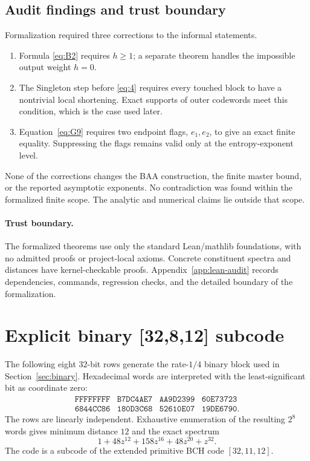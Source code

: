\documentclass[runningheads,envcountsame,envcountsect]{llncs}
\begin{document}
\subsection{Audit findings and trust boundary}

Formalization required three corrections to the informal statements.

\begin{enumerate}
    \item Formula \eqref{eq:B2} requires $h\ge1$; a separate theorem handles the
          impossible output weight $h=0$.
    \item The Singleton step before \eqref{eq:4} requires every touched block to have a
          nontrivial local shortening.  Exact supports of outer codewords meet
          this condition, which is the case used later.
    \item Equation~\eqref{eq:G9} requires two endpoint flags, $e_1,e_2$, to give an
      exact finite equality.  Suppressing the flags remains valid only at
          the entropy-exponent level.
\end{enumerate}

None of the corrections changes the BAA construction, the finite master bound,
or the reported asymptotic exponents.  No contradiction was found within the
formalized finite scope.  The analytic and numerical claims lie outside that
scope.

\paragraph{Trust boundary.}
The formalized theorems use only the standard Lean/mathlib foundations,
with no admitted proofs or project-local axioms.  Concrete constituent
spectra and distances have kernel-checkable proofs.
Appendix~\ref{app:lean-audit} records dependencies, commands, regression
checks, and the detailed boundary of the formalization.




\appendix
\renewcommand{\theHsection}{appendix.\Alph{section}}
\section{Explicit binary [32,8,12] subcode}
\label{app:binary-generator}

The following eight $32$-bit rows generate the rate-$1/4$ binary block used in
Section~\ref{sec:binary}.  Hexadecimal words are interpreted with the
least-significant bit as coordinate zero:
\[
\begin{array}{cccc}
\texttt{FFFFFFFF} & \texttt{B7DC4AE7} & \texttt{AA9D2399} & \texttt{60E73723}\\
\texttt{6844CC86} & \texttt{180D3C68} & \texttt{52610E07} & \texttt{19DE6790}.
\end{array}
\]
The rows are linearly independent.  Exhaustive enumeration of the resulting
$2^8$ words gives minimum distance $12$ and the exact spectrum
\[
    1+48z^{12}+158z^{16}+48z^{20}+z^{32}.
\]
The code is a subcode of the extended primitive BCH code $[32,11,12]$.
\end{document}
